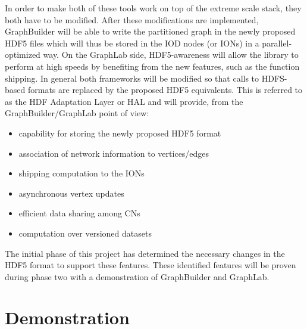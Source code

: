\documentclass[conference]{IEEEtran}
\begin{document}
In order to make both of these tools work on top of the extreme scale stack,
they both have to be modified. After these modifications are implemented,
GraphBuilder will be able to write the partitioned graph in the newly proposed
HDF5 files which will thus be stored in the IOD nodes (or IONs) in a
parallel-optimized way. On the GraphLab side, HDF5-awareness will allow
the library to perform at high speeds by benefiting from the new
features, such as the function shipping. In general both frameworks will be
modified so that calls to HDFS-based formats are replaced by the proposed HDF5
equivalents. This is referred to as the HDF Adaptation Layer or HAL and will
provide, from the GraphBuilder/GraphLab point of view:

\begin{itemize}
\itemsep1pt\parskip0pt
\item
  capability for storing the newly proposed HDF5 format
\item
  association of network information to vertices/edges
\item
  shipping computation to the IONs
\item
  asynchronous vertex updates
\item
  efficient data sharing among CNs
\item
  computation over versioned datasets
\end{itemize}

The initial phase of this project has determined the necessary changes in the
HDF5 format to support these features. These identified features will be
proven during phase two with a demonstration of GraphBuilder and GraphLab.

\section{Demonstration}
\label{sec:evaluation}
\end{document}
